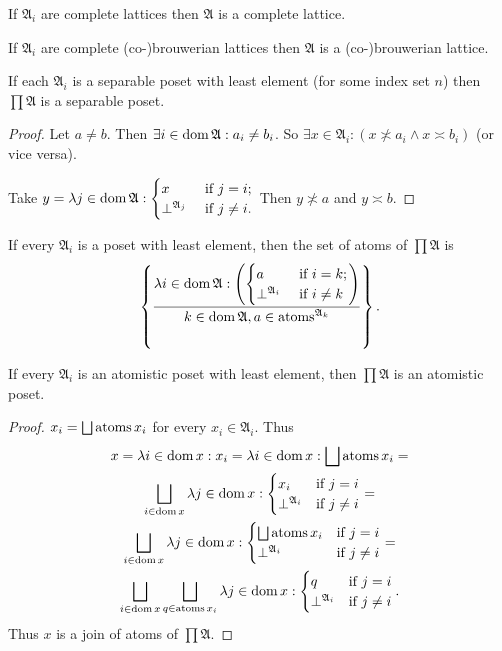 \begin{cor}
If $\mathfrak{A}_{i}$ are complete lattices then $\mathfrak{A}$
is a complete lattice.\end{cor}
\begin{obvious}
If $\mathfrak{A}_{i}$ are complete (co-)brouwerian lattices then
$\mathfrak{A}$ is a (co-)brouwerian lattice.\end{obvious}
\begin{prop}
If each $\mathfrak{A}_{i}$ is a separable poset with least element
(for some index set $n$) then $\prod\mathfrak{A}$ is a separable
poset.\end{prop}
\begin{proof}
Let $a\neq b$. Then $\exists i\in\operatorname{dom}\mathfrak{A}:a_{i}\neq b_{i}$.
So $\exists x\in\mathfrak{A}_{i}:(x\nasymp a_{i}\wedge x\asymp b_{i})$
(or vice versa).

Take $y=\lambda j\in\operatorname{dom}\mathfrak{A}:\begin{cases}x&\text{ if }j=i;\\\bot^{\mathfrak{A}_j}&\text{ if }j\ne i.\end{cases}$
Then $y\nasymp a$ and $y\asymp b$.\end{proof}
\begin{obvious}
If every $\mathfrak{A}_{i}$ is a poset with least element,
then the set of atoms of $\prod\mathfrak{A}$ is
\[
\left\{ \frac{\lambda i\in\operatorname{dom}\mathfrak{A}:\left(\begin{cases}a&\text{ if }i=k;\\\bot^{\mathfrak{A}_i}&\text{ if }i\ne k\end{cases}\right)}{k\in\operatorname{dom}\mathfrak{A}, a\in\operatorname{atoms}^{\mathfrak{A}_{k}}}\right\}.
\]
\end{obvious}
\begin{prop}
If every $\mathfrak{A}_{i}$ is an atomistic poset with least element, then $\prod\mathfrak{A}$ is an atomistic poset.\end{prop}
\begin{proof}
$x_{i}=\bigsqcup\operatorname{atoms} x_{i}$ for every $x_{i}\in\mathfrak{A}_{i}$.
Thus
\begin{multline*}
x=\lambda i\in\operatorname{dom} x:x_{i}=
\lambda i\in\operatorname{dom} x:\bigsqcup\operatorname{atoms} x_{i}=\\
\bigsqcup_{i\in\operatorname{dom} x}\lambda j\in\operatorname{dom} x:\begin{cases}
x_{i} & \text{if }j=i\\
\bot^{\mathfrak{A}_i} & \text{if }j\ne i
\end{cases} = \\
\bigsqcup_{i\in\operatorname{dom} x}\lambda j\in\operatorname{dom} x:\begin{cases}
\bigsqcup\operatorname{atoms} x_{i} & \text{if }j=i\\
\bot^{\mathfrak{A}_i} & \text{if }j\ne i
\end{cases} =\\
\bigsqcup_{i\in\operatorname{dom} x}\bigsqcup_{q\in\operatorname{atoms} x_i}\lambda j\in\operatorname{dom} x:\begin{cases}
q & \text{if }j=i\\
\bot^{\mathfrak{A}_i} & \text{if }j\ne i
\end{cases}.
\end{multline*}
Thus $x$ is a join of atoms of $\prod\mathfrak{A}$.\end{proof}
